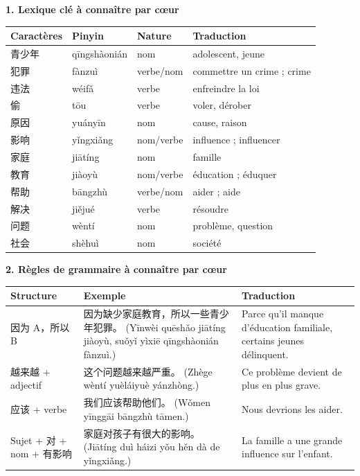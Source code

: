 \documentclass[11pt]{article}
\begin{document}
\begin{bilan}
\textbf{1. Lexique clé à connaître par cœur}
\begin{center}
\begin{tabularx}{\linewidth}{|X|X|X|X|}
\hline
\rowcolor{popblueL} Caractères & Pinyin & Nature & Traduction \\
\hline
青少年 & qīngshàonián & nom & adolescent, jeune \\
\hline
犯罪 & fànzuì & verbe/nom & commettre un crime ; crime \\
\hline
违法 & wéifǎ & verbe & enfreindre la loi \\
\hline
偷 & tōu & verbe & voler, dérober \\
\hline
原因 & yuányīn & nom & cause, raison \\
\hline
影响 & yǐngxiǎng & nom/verbe & influence ; influencer \\
\hline
家庭 & jiātíng & nom & famille \\
\hline
教育 & jiàoyù & nom/verbe & éducation ; éduquer \\
\hline
帮助 & bāngzhù & verbe/nom & aider ; aide \\
\hline
解决 & jiějué & verbe & résoudre \\
\hline
问题 & wèntí & nom & problème, question \\
\hline
社会 & shèhuì & nom & société \\
\hline
\end{tabularx}
\end{center}

\textbf{2. Règles de grammaire à connaître par cœur}
\begin{center}
\begin{tabularx}{\linewidth}{|X|X|X|}
\hline
\rowcolor{popblueL} Structure & Exemple & Traduction \\
\hline
因为 A，所以 B & 因为缺少家庭教育，所以一些青少年犯罪。 (Yīnwèi quēshǎo jiātíng jiàoyù, suǒyǐ yìxiē qīngshàonián fànzuì.) & Parce qu'il manque d'éducation familiale, certains jeunes délinquent. \\
\hline
越来越 + adjectif & 这个问题越来越严重。 (Zhège wèntí yuèláiyuè yánzhòng.) & Ce problème devient de plus en plus grave. \\
\hline
应该 + verbe & 我们应该帮助他们。 (Wǒmen yīnggāi bāngzhù tāmen.) & Nous devrions les aider. \\
\hline
Sujet + 对 + nom + 有影响 & 家庭对孩子有很大的影响。 (Jiātíng duì háizi yǒu hěn dà de yǐngxiǎng.) & La famille a une grande influence sur l'enfant. \\
\hline
\end{tabularx}
\end{center}


\end{bilan}
\end{document}
